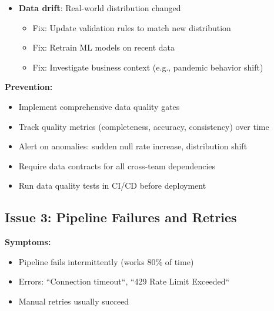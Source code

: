 \begin{enumerate}
\begin{itemize}
            \item \textbf{Data drift}: Real-world distribution changed
                \begin{itemize}
                    \item Fix: Update validation rules to match new distribution
                    \item Fix: Retrain ML models on recent data
                    \item Fix: Investigate business context (e.g., pandemic behavior shift)
                \end{itemize}
        \end{itemize}
\end{enumerate}

\textbf{Prevention:}
\begin{itemize}
    \item Implement comprehensive data quality gates
    \item Track quality metrics (completeness, accuracy, consistency) over time
    \item Alert on anomalies: sudden null rate increase, distribution shift
    \item Require data contracts for all cross-team dependencies
    \item Run data quality tests in CI/CD before deployment
\end{itemize}

\subsection{Issue 3: Pipeline Failures and Retries}

\textbf{Symptoms:}
\begin{itemize}
    \item Pipeline fails intermittently (works 80\% of time)
    \item Errors: ``Connection timeout``, ``429 Rate Limit Exceeded``
    \item Manual retries usually succeed
\end{itemize}


